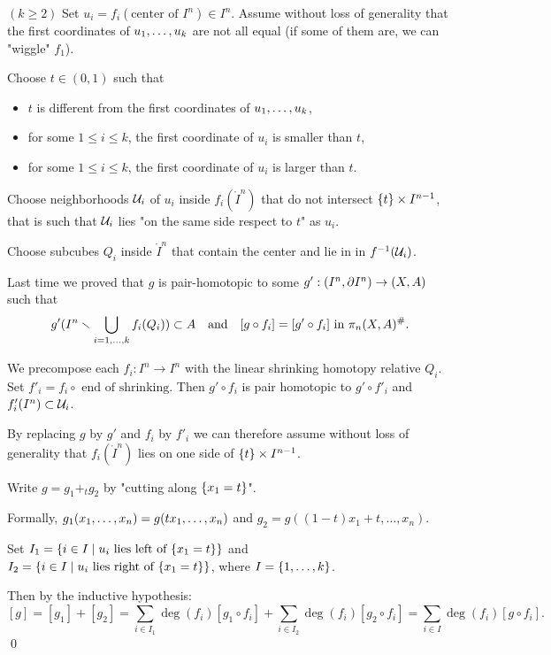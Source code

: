 
$(k\geq2)$ Set $u_i=f_i(\text{center of } I^n)\in I^n$. Assume without loss of generality that the first coordinates of ${{u}_1,\dots,{u}_{k}}$ are not all equal (if some of them are, we can "wiggle" $f_1$).



Choose $t\in (0,1)$ such that
\begin{itemize}
    \item $t$ is different from the first coordinates of ${{u}_1,\dots,{u}_{k}}$,
    \item for some $1\leq i\leq k$, the first coordinate of $u_i$ is smaller than $t$,
    \item for some $1\leq i\leq k$, the first coordinate of $u_i$ is larger than $t$.
\end{itemize}

Choose neighborhoods $\mathcal{U}_i$ of $u_i$ inside $f_i(\ring I^n)$ that do not intersect $\{t\}\times I^{n-1}$, that is such that $\mathcal{U}_i$ lies "on the same side respect to $t$" as $u_i$.

Choose subcubes $Q_i$ inside $\ring I^n$ that contain the center and lie in in $f^{-1}(\mathcal{U}_i)$.

Last time we proved that $g$ is pair-homotopic to some $g':(I^n,\partial I^n)\to(X,A)$ such that
\[g'(I^n\smallsetminus\bigcup_{i=1,\dots,k} f_i(Q_i))\subset A\quad\text{and}\quad[g\circ f_i]=[g'\circ f_i]\text{ in }\pi_n(X,A)^\#.\]

We precompose each $f_i:I^n\to I^n$ with the linear shrinking homotopy relative $Q_i$. Set $f'_i=f_i\circ \text{ end of shrinking}$. Then $g'\circ f_i$ is pair homotopic to $g'\circ f'_i$ and $f'_i(I^n)\subset\mathcal{U}_i$.

By replacing $g$ by $g'$ and $f_i$ by $f'_i$ we can therefore assume without loss of generality that $f_i(\ring I^n)$ lies on one side of $\{t\}\times I^{n-1}$.

\smallskip

Write $g=g_1+_t g_2$ by "cutting along $\{x_1=t\}$".

Formally, $g_1({x_1,\dots,x_n})=g(t{x_1,\dots,x_n})$ and $g_2=g((1-t)x_1+t,\dots,x_n)$.

Set $I_1=\{i\in I\mid u_i\text{ lies left of }\{x_1=t\}\}$ and $I_2=\{i\in I\mid u_i\text{ lies right of }\{x_1=t\}\}$, where $I=\{1,\dots,k\}$.

Then by the inductive hypothesis:
\[[g]=[g_1]+[g_2]=\sum_{i\in I_1}\deg(f_i)[g_1\circ f_i]+\sum_{i\in I_2}\deg(f_i)[g_2\circ f_i]=\sum_{i\in I}\deg(f_i)[g\circ f_i].\]\qed

